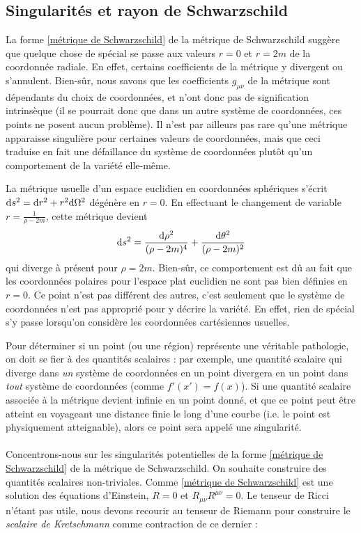 \subsection{Singularités et rayon de Schwarzschild}
La forme \ref{métrique de Schwarzschild} de la métrique de Schwarzschild suggère que quelque chose de spécial se passe aux valeurs $r = 0$ et $r = 2m$ de la coordonnée radiale. En effet, certains coefficients de la métrique y divergent ou s'annulent. Bien-sûr, nous savons que les coefficients $g_{\mu\nu}$ de la métrique sont dépendants du choix de coordonnées, et n'ont donc pas de signification intrinsèque (il se pourrait donc que dans un autre système de coordonnées, ces points ne posent aucun problème). Il n'est par ailleurs pas rare qu'une métrique apparaisse singulière pour certaines valeurs de coordonnées, mais que ceci traduise en fait une défaillance du système de coordonnées plutôt qu'un comportement de la variété elle-même. 
\begin{exmp}
    La métrique usuelle d'un espace euclidien en coordonnées sphériques s'écrit $\mathrm{d} s^2 = \mathrm{d} r^2 + r^2 \mathrm{d} \Omega^2$ dégénère en $r=0$. En effectuant le changement de variable $r = \frac{1}{\rho - 2m}$, cette métrique devient
    \begin{equation}
        \mathrm{d} s^2 = \frac{\mathrm{d} \rho^2}{(\rho - 2m)^4} + \frac{\mathrm{d} \theta^2}{(\rho -2m)^2}
    \end{equation}
    qui diverge à présent pour $\rho=2m$. Bien-sûr, ce comportement est dû au fait que les coordonnées polaires pour l'espace plat euclidien ne sont pas bien définies en $r=0$. Ce point n'est pas différent des autres, c'est seulement que le système de coordonnées n'est pas approprié pour y décrire la variété. En effet, rien de spécial s'y passe lorsqu'on considère les coordonnées cartésiennes usuelles.
\end{exmp}
Pour déterminer si un point (ou une région) représente une véritable pathologie, on doit se fier à des quantités scalaires : par exemple, une quantité scalaire qui diverge dans \emph{un} système de coordonnées en un point divergera en un point dans \emph{tout} système de coordonnées (comme $f'(x') = f(x)$). Si une quantité scalaire associée à la métrique devient infinie en un point donné, et que ce point peut être atteint en voyageant une distance finie le long d'une courbe (i.e. le point est physiquement atteignable), alors ce point sera appelé une singularité.\\
\\
Concentrons-nous sur les singularités potentielles de la forme \ref{métrique de Schwarzschild} de la métrique de Schwarzschild. On souhaite construire des quantités scalaires non-triviales. Comme \ref{métrique de Schwarzschild} est une solution des équations d'Einstein, $R = 0$ et $R_{\mu\nu} R^{\mu\nu} = 0$. Le tenseur de Ricci n'étant pas utile, nous devons recourir au tenseur de Riemann pour construire le \emph{scalaire de Kretschmann} comme contraction de ce dernier :

